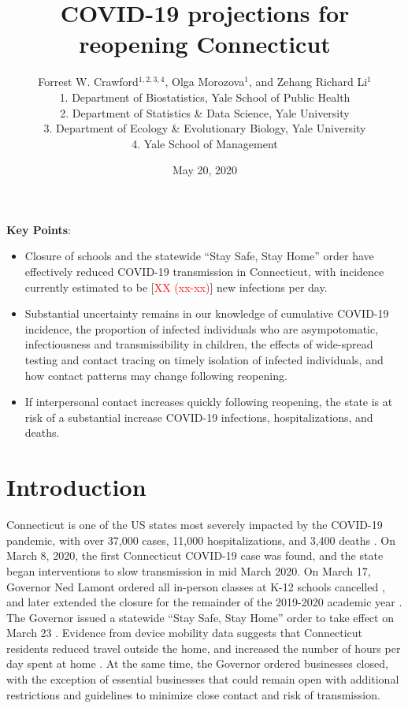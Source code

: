 \documentclass[11pt]{article}
\title{COVID-19 projections for reopening Connecticut}
\author{
  Forrest W. Crawford$^{1,2,3,4}$,
  Olga Morozova$^{1}$, 
  and
  Zehang Richard Li$^1$
  \\[1em]
\small 1. Department of Biostatistics, Yale School of Public Health \\
\small 2. Department of Statistics \& Data Science, Yale University \\
\small 3. Department of Ecology \& Evolutionary Biology, Yale University \\
\small 4. Yale School of Management }
\date{May 20, 2020}
\newcommand{\comment}[1]{[\textcolor{red}{#1}]}
\begin{document}
\maketitle


\textbf{Key Points}:
\vspace{-0.5em}
\begin{itemize}[itemsep=0em, parsep=0em, topsep=0em]
  \item Closure of schools and the statewide ``Stay Safe, Stay Home'' order have effectively reduced COVID-19 transmission in Connecticut, with incidence currently estimated to be \comment{XX (xx-xx)} new infections per day.  
  \item Substantial uncertainty remains in our knowledge of cumulative COVID-19 incidence, the proportion of infected individuals who are asympotomatic, infectiousness and transmissibility in children, the effects of wide-spread testing and contact tracing on timely isolation of infected individuals, and how contact patterns may change following reopening.  
  \item If interpersonal contact increases quickly following reopening, the state is at risk of a substantial increase COVID-19 infections, hospitalizations, and deaths.
\end{itemize}



\section*{Introduction}

Connecticut is one of the US states most severely impacted by the COVID-19 pandemic, with over 37,000 cases, 11,000 hospitalizations, and 3,400 deaths \citep{nyt2020Connecticut,atlantic2020data}.  On March 8, 2020, the first Connecticut COVID-19 case was found, and the state began interventions to slow transmission in mid March 2020.  On March 17, Governor Ned Lamont ordered all in-person classes at K-12 schools cancelled \citep{lamont2020exec7c}, and later extended the closure for the remainder of the 2019-2020 academic year \citep{lamont2020exec7l,lamont2020exec7x,lamont2020exec7ii}.  The Governor issued a statewide ``Stay Safe, Stay Home'' order to take effect on March 23 \citep{lamont2020exec7h}.  Evidence from device mobility data suggests that Connecticut residents reduced travel outside the home, and increased the number of hours per day spent at home \citep{google2020covid,facebook2020covid}. At the same time, the Governor ordered businesses closed, with the exception of essential businesses that could remain open with additional restrictions and guidelines to minimize close contact and risk of transmission. 
\end{document}
